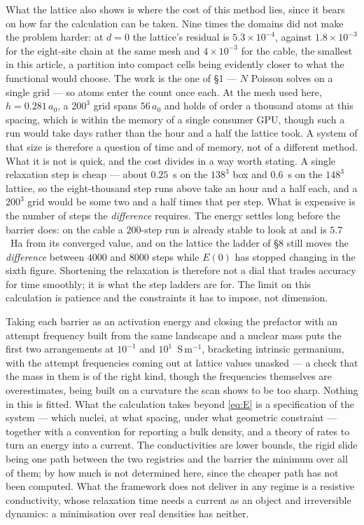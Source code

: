 \documentclass[11pt]{article}
\begin{document}
What the lattice also shows is where the cost of this method lies, since it bears on how far the
calculation can be taken. Nine times the domains did not make the problem harder: at $d=0$ the
lattice's residual is $5.3\times10^{-4}$, against $1.8\times10^{-3}$ for the eight-site chain at
the same mesh and $4\times10^{-3}$ for the cable, the smallest in this article, a partition into compact cells being
evidently closer to what the functional would choose. The work is the one of \S1 --- $N$ Poisson solves on a single
grid --- so atoms enter the count once each. At the mesh used here, $h=0.281\,a_0$, a $200^3$ grid spans $56\,a_0$ and holds
of order a thousand atoms at this spacing, which is within the memory of a single consumer GPU, though
such a run would take days rather than the hour and a half the lattice took. A
system of that size is therefore a question of time and of memory, not of a different method. What it is not is quick, and the cost divides in a way worth stating. A single relaxation step is
cheap --- about $0.25$~s on the $138^3$ box and $0.6$~s on the $148^3$ lattice, so the eight-thousand
step runs above take an hour and a half each, and a $200^3$ grid would be some two and a half times
that per step. What is expensive is the number of steps the \emph{difference} requires. The energy
settles long before the barrier does: on the cable a $200$-step run is already stable to look at and
is $5.7$~Ha from its converged value, and on the lattice the ladder of \S8 still moves the
\emph{difference} between $4000$ and $8000$ steps while $E(0)$ has stopped changing in the sixth
figure. Shortening the
relaxation is therefore not a dial that trades accuracy for time smoothly; it is what the step ladders
are for. The limit on this calculation is patience and the constraints it has to impose, not dimension.

Taking each barrier as an activation energy and closing the prefactor with an attempt frequency
built from the same landscape and a nuclear mass puts the first two arrangements at $10^{-1}$ and
$10^{1}$~S\,m$^{-1}$, bracketing intrinsic germanium, with the attempt frequencies coming out at
lattice values unasked --- a check that the mass in them is of the right kind, though the
frequencies themselves are overestimates, being built on a curvature the scan shows to be too
sharp. Nothing in this is fitted. What the calculation takes beyond \eqref{eq:E} is a specification
of the system --- which nuclei, at what spacing, under what geometric constraint --- together with a
convention for reporting a bulk density, and a theory of rates to turn an energy into a current. The conductivities are lower bounds, the rigid slide being one path between the two registries
and the barrier the minimum over all of them; by how much is not determined here, since the cheaper
path has not been computed. What the framework does not deliver in any regime
is a resistive conductivity, whose relaxation time needs a current as an object and irreversible
dynamics: a minimisation over real densities has neither.
\end{document}
